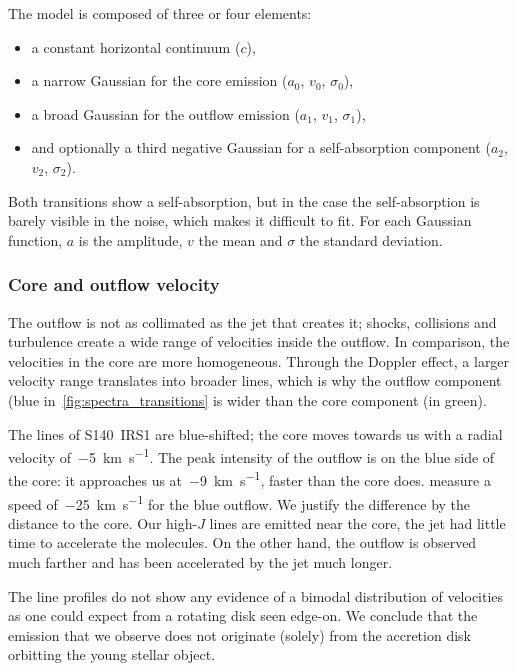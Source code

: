 The model is composed of three or four elements:
\begin{itemize}[noitemsep,nolistsep]
    \item a constant horizontal continuum ($c$),
    \item a narrow Gaussian for the core emission ($a_0$, $v_0$, $\sigma_0$),
    \item a broad Gaussian for the outflow emission ($a_1$, $v_1$, $\sigma_1$),
    \item and optionally a third negative Gaussian for a self-absorption component
     ($a_2$, $v_2$, $\sigma_2$).
\end{itemize}
Both transitions show a self-absorption, but in the case  the self-absorption is barely visible in the noise, which makes it difficult to fit.
For each Gaussian function, $a$ is the amplitude, $v$ the mean and $\sigma$ the standard deviation.

\subsubsection{Core and outflow velocity}
The outflow is not as collimated as the jet that creates it; shocks, collisions and turbulence create a wide range of velocities inside the outflow.
In comparison, the velocities in the core are more homogeneous.
Through the Doppler effect, a larger velocity range translates into broader lines, which is why the outflow component (blue in~\cref{fig:spectra_transitions} is wider than the core component (in green).

The  lines of S140~IRS1 are blue-shifted;
the core moves towards us with a radial velocity of~\SI{-5}{\kilo\meter\per\second}.
The peak intensity of the outflow is on the blue side of the core: it approaches us at~\SI{-9}{\kilo\meter\per\second}, faster than the core does.
\Textcite{maud2013s140} measure a speed of~\SI{-25}{\kilo\meter\per\second} for the blue  outflow.
We justify the difference by the distance to the core.
Our high-$J$ lines are emitted near the core, the jet had little time to accelerate the  molecules.
On the other hand, the  outflow is observed much farther and has been accelerated by the jet much longer.

The line profiles do not show any evidence of a bimodal distribution of velocities as one could expect from a rotating disk seen edge-on.
We conclude that the emission that we observe does not originate (solely) from the accretion disk orbitting the young stellar object.

